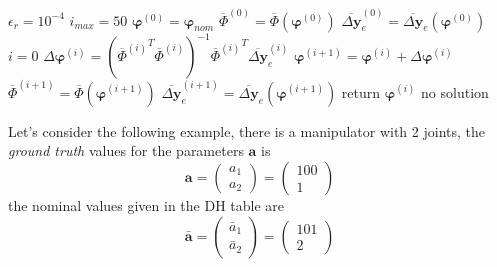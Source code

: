 \documentclass[10pt, a4paper]{report}
\begin{document}
\begin{algorithm}[H]
\caption{Calibration Algorithm}\label{alg:calibration}
\begin{algorithmic}[1]
\State $\epsilon_r=10^{-4}$ 
\State $i_{max}=50$ 
\State $\boldsymbol\varphi^{(0)}=\boldsymbol{\varphi}_{nom}$ 
\State $\overline\Phi^{(0)}=\overline\Phi(\boldsymbol\varphi^{(0)})$
\State $\overline{\Delta\mathbf y}_e^{(0)}=\overline{\Delta\mathbf y}_e(\boldsymbol\varphi^{(0)})$
\State $i=0$
\State $\Delta\boldsymbol\varphi^{(i)}=\left({\overline\Phi^{(i)}}^T\overline\Phi^{(i)}  \right)^{-1}{\overline\Phi^{(i)}}^T\overline{\Delta\mathbf y}_e^{(i)}$ 
\State $\boldsymbol{\varphi}^{(i+1)}=\boldsymbol{\varphi}^{(i)}+\Delta\boldsymbol\varphi^{(i)}$ 
\State $\overline\Phi^{(i+1)}=\overline\Phi(\boldsymbol\varphi^{(i+1)})$   
\State $\overline{\Delta\mathbf y}_e^{(i+1)}=\overline{\Delta\mathbf y}_e(\boldsymbol\varphi^{(i+1)})$ 
\EndWhile
{}
\State return $\boldsymbol{\varphi}^{(i)}$
\EndIf 
\State\Return no solution 
\end{algorithmic}
\end{algorithm}
Let's consider the following example, there is a manipulator with 2 joints, the \textit{ground truth} values for the parameters $\mathbf a$ is\begin{equation}
    \mathbf a=\begin{pmatrix}
        a_1\\ 
        a_2
    \end{pmatrix}=\begin{pmatrix}
        100\\ 
        1
    \end{pmatrix}
\end{equation}
the nominal values given in the DH table are \begin{equation}
    \bar{\mathbf a}=\begin{pmatrix}
        \bar a_1\\ 
        \bar a_2
    \end{pmatrix}=\begin{pmatrix}
        101\\ 
        2
    \end{pmatrix}
\end{equation}
\end{document}
